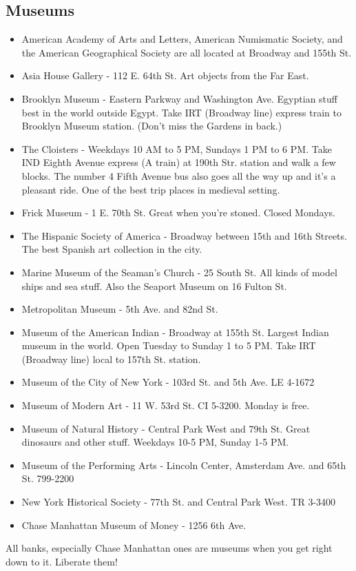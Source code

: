 \documentclass[11pt,twoside,a4paper]{book}
\begin{document}
\subsection{Museums}
\begin{itemize}
\item American Academy of Arts and Letters, American Numismatic Society, and the American Geographical Society are all located at Broadway and 155th St.
\item Asia House Gallery - 112 E. 64th St. Art objects from the Far East. 
\item Brooklyn Museum - Eastern Parkway and Washington Ave. Egyptian stuff best in the world outside Egypt. Take IRT (Broadway line) express train to Brooklyn Museum station. (Don't miss the Gardens in back.) 
\item The Cloisters - Weekdays 10 AM to 5 PM, Sundays 1 PM to 6 PM. Take IND Eighth Avenue express (A train) at 190th Str. station and walk a few blocks. The number 4 Fifth Avenue bus also goes all the way up and it's a pleasant ride. One of the best trip places in medieval setting. 
\item Frick Museum - 1 E. 70th St. Great when you're stoned. Closed Mondays. 
\item The Hispanic Society of America - Broadway between 15th and 16th Streets. The best Spanish art collection in the city. 
\item Marine Museum of the Seaman's Church - 25 South St. All kinds of model ships and sea stuff. Also the Seaport Museum on 16 Fulton St. 
\item Metropolitan Museum - 5th Ave. and 82nd St. 
\item Museum of the American Indian - Broadway at 155th St. Largest Indian museum in the world. Open Tuesday to Sunday 1 to 5 PM. Take IRT (Broadway line) local to 157th St. station. 
\item Museum of the City of New York - 103rd St. and 5th Ave. LE 4-1672 
\item Museum of Modern Art - 11 W. 53rd St. CI 5-3200. Monday is free.
\item Museum of Natural History - Central Park West and 79th St. Great dinosaurs and other stuff. Weekdays 10-5 PM, Sunday 1-5 PM. 
\item Museum of the Performing Arts - Lincoln Center, Amsterdam Ave. and 65th St. 799-2200 
\item New York Historical Society - 77th St. and Central Park West. TR 3-3400 
\item Chase Manhattan Museum of Money - 1256 6th Ave. 
\end{itemize}
All banks, especially Chase Manhattan ones are museums when you get right down to it. Liberate them!~\\
\end{document}
